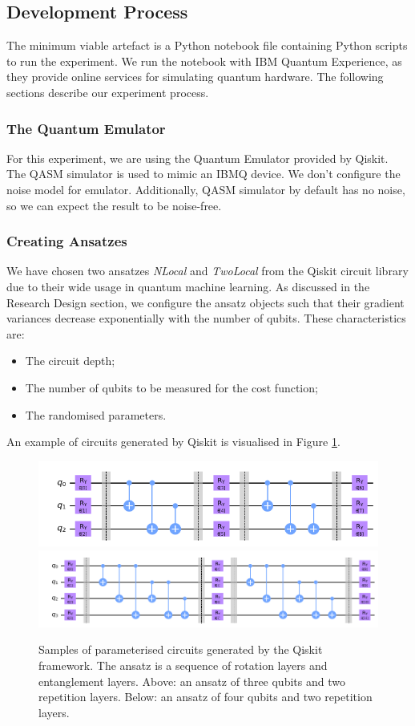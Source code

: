 \subsection{Development Process}
The minimum viable artefact is a Python notebook file containing Python scripts to run the experiment.
We run the notebook with IBM Quantum Experience, as they provide online services for simulating quantum hardware.
The following sections describe our experiment process.

\subsubsection{The Quantum Emulator}
For this experiment, we are using the Quantum Emulator provided by Qiskit.
The QASM simulator is used to mimic an IBMQ device.
We don't configure the noise model for emulator. 
Additionally, QASM simulator by default has no noise, so we can expect the result to be noise-free.

\subsubsection{Creating Ansatzes}
We have chosen two ansatzes \textit{NLocal} and \textit{TwoLocal} from the Qiskit circuit library due to their wide usage in quantum machine learning.
As discussed in the Research Design section, we configure the ansatz objects such that their gradient variances decrease exponentially with the number of qubits.
These characteristics are:
\begin{itemize}
    \item The circuit depth;
    \item The number of qubits to be measured for the cost function;
    \item The randomised parameters.
\end{itemize}
An example of circuits generated by Qiskit is visualised in Figure \ref{Ansatz samples}.

\begin{figure}
    \includegraphics[width=\textwidth]{Artefact/Appendices/ansatz3-2.png}
    \includegraphics[width=\textwidth]{Artefact/Appendices/ansatz4-2.png}
    \caption{
        Samples of parameterised circuits generated by the Qiskit framework.
        The ansatz is a sequence of rotation layers and entanglement layers.
        Above: an ansatz of three qubits and two repetition layers.
        Below: an ansatz of four qubits and two repetition layers.
    }
    \label{Ansatz samples}
\end{figure}

